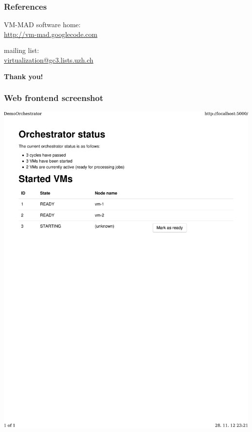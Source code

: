 \documentclass[english,serif,mathserif,xcolor=pdftex,dvipsnames,table]{beamer}
\begin{document}
\begin{frame}
  \frametitle{References}
  \begin{center}
    VM-MAD software home: \\ \url{http://vm-mad.googlecode.com}

    \+
    mailing list: \\ \url{virtualization@gc3.lists.uzh.ch}

    \+\+
    {\large \bf Thank you!}
  \end{center}
\end{frame}


\begin{frame}[label=webapp]
  \frametitle{Web frontend screenshot}
  \begin{center}
    \includegraphics[width=\linewidth]{fig/webapp}
  \end{center}

  \+
  \begin{flushright}
    \hyperlink{features}{}
  \end{flushright}
\end{frame}
\end{document}

